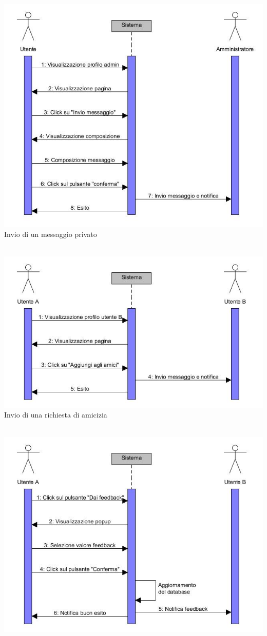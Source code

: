 \documentclass[a4paper,12pt]{article}
\begin{document}
\begin{center}
\includegraphics[scale=0.6]{sDiagrams/invioMessaggio.jpg} \\
\caption{Invio di un messaggio privato} \\
\vspace*{\fill}
\includegraphics[scale=0.6]{sDiagrams/richiestaAmicizia.jpg} \\
\caption{Invio di una richiesta di amicizia} \\
\clearpage
\includegraphics[scale=0.6]{sDiagrams/invioFeedback.jpg} \\

\end{center}
\end{document}
